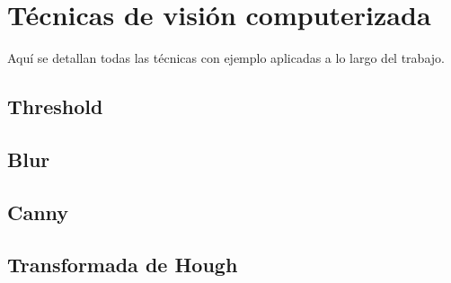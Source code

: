 \chapter{Técnicas de visión computerizada}

Aquí se detallan todas las técnicas con ejemplo aplicadas a lo largo del trabajo.

\section{Threshold}
\section{Blur}
\section{Canny}
\section{Transformada de Hough}